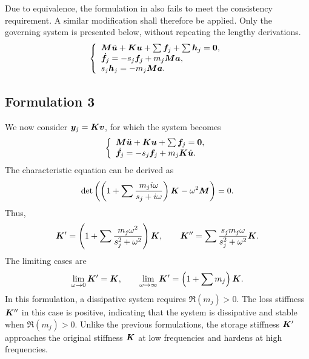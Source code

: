 Due to equivalence, the formulation in  also fails to meet the consistency requirement.
A similar modification shall therefore be applied.
Only the governing system is presented below, without repeating the lengthy derivations.
\begin{gather}\label{eq:a_right}
    \left\{\begin{array}{l}
        \bm{M}\ddot{\bm{u}}+\bm{K}\bm{u}+\sum\bm{f}_j+\sum\bm{h}_j=\bm{0}, \\
        \dot{\bm{f}}_j=-s_j\bm{f}_j+m_j\bm{M}\bm{a},\\
s_j\bm{h}_j=-m_j\bm{M}\bm{a}.
    \end{array}\right.
\end{gather}
\subsection{Formulation 3}\label{sec:v_dep_k}
We now consider $\bm{y}_j=\bm{K}\bm{v}$, for which the system becomes
\begin{gather}\label{eq:vel_formulation}
    \left\{\begin{array}{l}
        \bm{M}\ddot{\bm{u}}+\bm{K}\bm{u}+\sum\bm{f}_j=\bm{0}, \\
        \dot{\bm{f}}_j=-s_j\bm{f}_j+m_j\bm{K}\dot{\bm{u}}.
    \end{array}\right.
\end{gather}
The characteristic equation can be derived as
\begin{gather}\label{eq:vel_cha}
    \det\left(\left(1+\sum\dfrac{m_ji\omega}{s_j+i\omega}\right)\bm{K}-\omega^2\bm{M}\right)=0.
\end{gather}
Thus,
\begin{gather}
    \bm{K}'=\left(1+\sum\dfrac{m_j\omega^2}{s_j^2+\omega^2}\right)\bm{K},\qquad
    \bm{K}''=\sum\dfrac{s_jm_j\omega}{s_j^2+\omega^2}\bm{K}.
\end{gather}
The limiting cases are
\begin{gather}
    \lim\limits_{\omega\rightarrow0}\bm{K}'=\bm{K},\qquad
    \lim\limits_{\omega\rightarrow\infty}\bm{K}'=\left(1+\sum{}m_j\right)\bm{K}.
\end{gather}
In this formulation, a dissipative system requires $\Re\left(m_j\right)>0$.
The loss stiffness $\bm{K}''$ in this case is positive, indicating that the system is dissipative and stable when $\Re\left(m_j\right)>0$.
Unlike the previous formulations, the storage stiffness $\bm{K}'$ approaches the original stiffness $\bm{K}$ at low frequencies and hardens at high frequencies.

